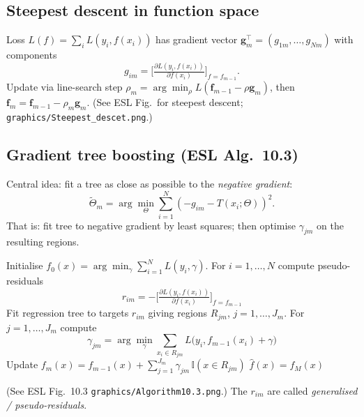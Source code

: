 \subsection{Steepest descent in function space}
Loss $L(f)=\sum_i L(y_i,f(x_i))$ has gradient vector $\mathbf{g}_m^\top=(g_{1m},\dots,g_{Nm})$ with components
\[ g_{im}=\Big[\tfrac{\partial L(y_i,f(x_i))}{\partial f(x_i)}\Big]_{f=f_{m-1}}. \]
Update via line-search step $\rho_m = \arg\min_\rho L(\mathbf{f}_{m-1}-\rho\mathbf{g}_m)$, then $\mathbf{f}_m = \mathbf{f}_{m-1} - \rho_m \mathbf{g}_m$.
(See ESL Fig.\ for steepest descent; \texttt{graphics/Steepest\_descet.png}.)

\subsection{Gradient tree boosting (ESL Alg.\ 10.3)}
Central idea: fit a tree as close as possible to the \emph{negative gradient}:
\[ \tilde\Theta_m = \arg\min_{\Theta} \sum_{i=1}^N (-g_{im} - T(x_i;\Theta))^2. \]
That is: fit tree to negative gradient by least squares; then optimise $\gamma_{jm}$ on the resulting regions.

\begin{algorithm}[H]
\caption{Gradient tree boosting (ESL Alg.\ 10.3)}
\begin{algorithmic}[1]
\State Initialise $f_0(x) = \arg\min_\gamma \sum_{i=1}^N L(y_i,\gamma)$.
  \State For $i=1,\dots,N$ compute pseudo-residuals
    \[ r_{im} = -\Big[\tfrac{\partial L(y_i,f(x_i))}{\partial f(x_i)}\Big]_{f=f_{m-1}} \]
  \State Fit regression tree to targets $r_{im}$ giving regions $R_{jm}$, $j=1,\dots,J_m$.
  \State For $j=1,\dots,J_m$ compute
    \[ \gamma_{jm} = \arg\min_\gamma \sum_{x_i\in R_{jm}} L\!\big(y_i, f_{m-1}(x_i) + \gamma\big) \]
  \State Update $f_m(x) = f_{m-1}(x) + \sum_{j=1}^{J_m} \gamma_{jm}\, \mathbb{I}(x\in R_{jm})$
\EndFor
\State \Return $\hat f(x) = f_M(x)$
\end{algorithmic}
\end{algorithm}
(See ESL Fig.\ 10.3 \texttt{graphics/Algorithm10.3.png}.) The $r_{im}$ are called \emph{generalised / pseudo-residuals}.

